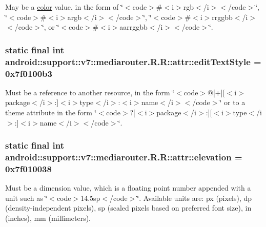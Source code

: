 May be a \hyperlink{classandroid_1_1support_1_1v7_1_1mediarouter_1_1_r_1_1color}{color} value, in the form of \char`\"{}$<$code$>$\#$<$i$>$rgb$<$/i$>$$<$/code$>$\char`\"{}, \char`\"{}$<$code$>$\#$<$i$>$argb$<$/i$>$$<$/code$>$\char`\"{}, \char`\"{}$<$code$>$\#$<$i$>$rrggbb$<$/i$>$$<$/code$>$\char`\"{}, or \char`\"{}$<$code$>$\#$<$i$>$aarrggbb$<$/i$>$$<$/code$>$\char`\"{}. \hypertarget{classandroid_1_1support_1_1v7_1_1mediarouter_1_1_r_1_1attr_0f02391cca5cb13cdb06a1f40ac71a37}{
\subsubsection[{editTextStyle}]{\setlength{\rightskip}{0pt plus 5cm}static final int android::support::v7::mediarouter.R.R::attr::editTextStyle = 0x7f0100b3}}
\label{classandroid_1_1support_1_1v7_1_1mediarouter_1_1_r_1_1attr_0f02391cca5cb13cdb06a1f40ac71a37}


Must be a reference to another resource, in the form \char`\"{}$<$code$>$@\mbox{[}+\mbox{]}\mbox{[}$<$i$>$package$<$/i$>$:\mbox{]}$<$i$>$type$<$/i$>$:$<$i$>$name$<$/i$>$$<$/code$>$\char`\"{} or to a theme attribute in the form \char`\"{}$<$code$>$?\mbox{[}$<$i$>$package$<$/i$>$:\mbox{]}\mbox{[}$<$i$>$type$<$/i$>$:\mbox{]}$<$i$>$name$<$/i$>$$<$/code$>$\char`\"{}. \hypertarget{classandroid_1_1support_1_1v7_1_1mediarouter_1_1_r_1_1attr_c3827623f55901e9b6d0345ae1a000a2}{
\subsubsection[{elevation}]{\setlength{\rightskip}{0pt plus 5cm}static final int android::support::v7::mediarouter.R.R::attr::elevation = 0x7f010038}}
\label{classandroid_1_1support_1_1v7_1_1mediarouter_1_1_r_1_1attr_c3827623f55901e9b6d0345ae1a000a2}


Must be a dimension value, which is a floating point number appended with a unit such as \char`\"{}$<$code$>$14.5sp$<$/code$>$\char`\"{}. Available units are: px (pixels), dp (density-independent pixels), sp (scaled pixels based on preferred font size), in (inches), mm (millimeters). 

